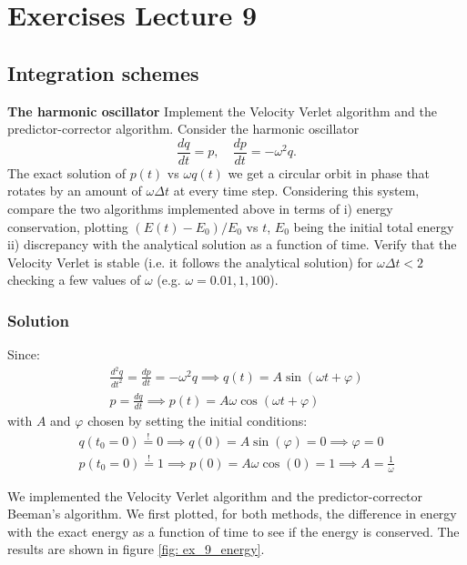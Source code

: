 \documentclass[../main.tex]{subfiles}
\begin{document}
\chapter{Exercises Lecture 9}


\section{Integration schemes}
\textbf{The harmonic oscillator} Implement the Velocity Verlet algorithm and the predictor-corrector algorithm.
Consider the harmonic oscillator
\begin{equation}
\frac{dq}{dt} = p, \quad \frac{dp}{dt} = -\omega^2 q.
\end{equation}
The exact solution of $p(t)$ vs $\omega q(t)$ we get a circular orbit in phase that rotates by an amount of $\omega \Delta t$ at
every time step. Considering this system, compare the two algorithms implemented above in terms of i)
energy conservation, plotting $(E(t) - E_0) / E_0$ vs $t$, $E_0$ being the initial total energy ii) discrepancy with the
analytical solution as a function of time. Verify that the Velocity Verlet is stable (i.e. it follows the analytical
solution) for $\omega \Delta t < 2$ checking a few values of $\omega$ (e.g. $\omega = 0.01, 1, 100$).

\subsection{Solution}

Since:
\begin{align}
    \frac{d^2q}{{dt}^2} = \frac{dp}{dt} = -\omega^2q \implies q(t) = A\sin(\omega t + \varphi)\\
    p= \frac{dq}{dt}\implies p(t) = A\omega\cos(\omega t + \varphi)
\end{align}with $A$ and $\varphi$ chosen by setting the initial conditions:
\begin{align}
    q(t_0=0) \stackrel{!}{=} 0 \implies q(0) = A\sin(\varphi) = 0 \implies \varphi = 0\\
    p(t_0=0) \stackrel{!}{=} 1 \implies p(0) = A\omega\cos(0)=1 \implies A=\frac{1}{\omega}
\end{align}

We implemented the Velocity Verlet algorithm and the predictor-corrector Beeman's algorithm. We first plotted, for both methods, the difference in energy with the exact energy as a function of time to see if the energy is conserved. The results are shown in figure \ref{fig: ex_9_energy}.
\end{document}
